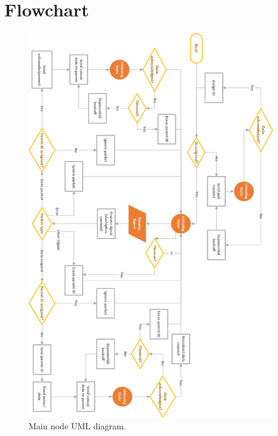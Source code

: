 \chapter{Flowchart} \label{cha:flowchart}
\begin{figure}[h!]
\centering
\includegraphics[width=0.95\textwidth]{chapters/appendix/flowchart.png}
\caption{Main node UML diagram.}
\label{fig:mainuml}
\end{figure}
\clearpage
